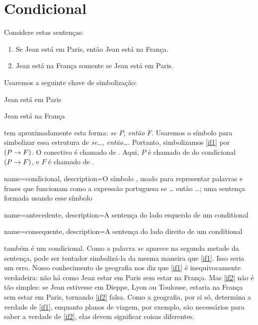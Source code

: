 \section{Condicional}
Considere estas sentenças:
	\begin{enumerate}
		\item\label{if1}Se Jean está em Paris, então Jean está na França.
		\item\label{if2}Jean está na França somente se Jean está em Paris.
	\end{enumerate}
Usaremos a seguinte chave de simbolização:
	\begin{ekey}
		\item[P] Jean está em Paris
		\item[F] Jean está na França
	\end{ekey}
 tem aproximadamente esta forma: \emph{se $P$, então
$F$}. Usaremos o símbolo \eif para simbolizar essa estrutura de
\emph{se\ldots, então\ldots}. Portanto, simbolizamos \cref*{if1} por
$(P\rightarrow F)$. O conectivo é chamado de . Aqui, $P$ é
chamado de  do condicional $(P \rightarrow F)$, e $F$ é
chamado de .

{
name=condicional,
description={O símbolo \eif, usado para representar palavras e frases que funcionam como a expressão portuguesa se \dots{} então \dots{}; uma sentença formada usando esse símbolo}
}

{
name=antecedente,
description={A sentença do lado esquerdo de um \gls{conditional}}
}


{
name=consequente,
description={A sentença do lado direito de um \gls{conditional}}
}

 também é um condicional. Como a palavra \emph{se} aparece na
segunda metade da sentença, pode ser tentador simbolizá-la da mesma
maneira que \cref*{if1}. Isso seria um erro. Nosso conhecimento de
geografia nos diz que \cref*{if1} é inequivocamente verdadeira: não há
como Jean estar em Paris sem estar na França. Mas \cref*{if2} não é tão
simples: se Jean estivesse em Dieppe, Lyon ou Toulouse, estaria na
França sem estar em Paris, tornando \cref*{if2} falsa. Como a geografia,
por si só, determina a verdade de \cref*{if1}, enquanto planos de viagem,
por exemplo, são necessários para saber a verdade de \cref*{if2}, elas
devem significar coisas diferentes.

